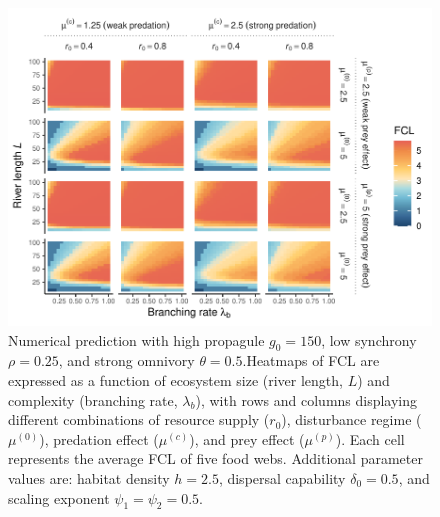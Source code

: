 \begin{figure}
\centering
\includegraphics{../data_fmt/fig_rho025_g150_theta05.pdf}
\caption{Numerical prediction with high propagule \(g_0 = 150\), low
synchrony \(\rho = 0.25\), and strong omnivory \(\theta = 0.5\).Heatmaps
of FCL are expressed as a function of ecosystem size (river length,
\(L\)) and complexity (branching rate, \(\lambda_b\)), with rows and
columns displaying different combinations of resource supply (\(r_0\)),
disturbance regime (\(\mu^{(0)}\)), predation effect (\(\mu^{(c)}\)),
and prey effect (\(\mu^{(p)}\)). Each cell represents the average FCL of
five food webs. Additional parameter values are: habitat density
\(h=2.5\), dispersal capability \(\delta_0=0.5\), and scaling exponent
\(\psi_1=\psi_2=0.5\).}
\end{figure}

\newpage

